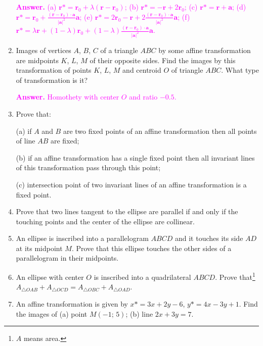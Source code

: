 \documentclass[a4paper,10pt]{article}
\begin{document}
\begin{enumerate}
\textcolor{magenta}{\textbf{Answer.} (a) $\textbf{r}*=\textbf{r}_0+\lambda(\textbf{r}-\textbf{r}_0)$; (b) $\textbf{r}*=-\textbf{r}+2\textbf{r}_0$; (c) $\textbf{r}*=\textbf{r}+\textbf{a}$; (d) $\textbf{r}*=\textbf{r}_0+\frac{\left(\textbf{r}-\textbf{r}_0\right)\cdot\textbf{a}}{|\textbf{a}|^2}\textbf{a}$; (e) $\textbf{r}*=2\textbf{r}_0-\textbf{r}+2\frac{\left(\textbf{r}-\textbf{r}_0\right)\cdot\textbf{a}}{|\textbf{a}|^2}\textbf{a}$; (f) $\textbf{r}*=\lambda\textbf{r}+(1-\lambda)\textbf{r}_0+(1-\lambda) \frac{\left(\textbf{r}-\textbf{r}_0\right)\cdot\textbf{a}}{|\textbf{a}|^2}\textbf{a}$.}

\item Images of vertices $A$, $B$, $C$ of a triangle $ABC$ by some affine transformation are midpoints $K$, $L$, $M$ of their opposite sides. Find the images by this transformation of points $K$, $L$, $M$ and centroid $O$ of triangle $ABC$. What type of transformation is it?

\textcolor{magenta}{\textbf{Answer.} Homothety with center $O$ and ratio $-0{.}5$.}

\item Prove that:

(a) if $A$ and $B$ are two fixed points of an affine transformation then all points of line $AB$ are fixed;

(b) if an affine transformation has a single fixed point then all invariant lines of this transformation pass through this point;

(c) intersection point of two invariant lines of an affine transformation is a fixed point.

\item Prove that two lines tangent to the ellipse are parallel if and only if the touching points and the center of the ellipse are collinear.
    
\item An ellipse is inscribed into a parallelogram $ABCD$ and it touches its side $AD$ at its midpoint $M$. Prove that this ellipse touches the other sides of a parallelogram in their midpoints.
    
\item An ellipse with center $O$ is inscribed into a quadrilateral $ABCD$. Prove that\footnote{$A$ means area.} $A_{\triangle OAB}+A_{\triangle OCD}=A_{\triangle OBC}+A_{\triangle OAD}$.
    
\item An affine transformation is given by $x*=3x+2y-6$, $y*=4x-3y+1$. Find the images of (a) point $M(-1;\,5)$; (b) line $2x+3y=7$.
    

\end{enumerate}
\end{document}
